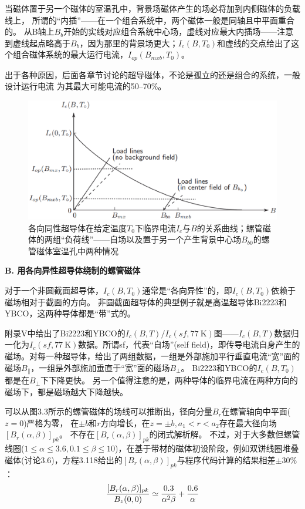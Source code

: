 当磁体置于另一个磁体的室温孔中，背景场磁体产生的场必将加到内侧磁体的负载线上，
所谓的“内插”——在一个组合系统中，两个磁体一般是同轴且中平面重合的。
从B轴上$B_{b}$开始的实线对应组合系统中心场，虚线对应最大内插场——注意到虚线起点略高于$B_{b}$，因为那里的背景场更大；$I_c(B,T_0)$和虚线的交点给出了这个组合磁体系统的最大运行电流，$I_{op}(B_{mxb},T_0)$。

出于各种原因，后面各章节讨论的超导磁体，不论是孤立的还是组合的系统，一般设计运行电流
为其最大可能电流的50–70\%。

\begin{figure}[htbp]
	\centering
	\includegraphics[scale=0.4]{chpt3/figs/fig3.19.eps}
	\caption{各向同性超导体在给定温度$T_0$下临界电流$I_c$与$B$的关系曲线；螺管磁体的两组“负荷线”——自场以及置于另一个产生背景中心场$B_{b0}$的螺管磁体室温孔中两种情况}
\end{figure}

\textbf{B. 用各向异性超导体绕制的螺管磁体}

对于一个非圆截面超导体，$I_c(B,T_0)$通常是“各向异性”的，即$I_c(B,T_0)$依赖于磁场相对于截面的方向。
非圆截面超导体的典型例子就是高温超导体Bi2223和YBCO，这两种导体都是“带”式的。

附录V中给出了Bi2223和YBCO的$I_c(B, T)/I_c(sf,77\ \mathrm{K})$图——$I_c(B, T)$数据归一化为$I_c(sf,77\ \mathrm{K})$数据。所谓sf，代表“自场”(self field)，即传导电流自身产生的磁场。对每一种超导体，给出了两组数据，一组是外部施加平行垂直电流“宽”面的磁场$B_{\parallel}$，一组是外部施加垂直于“宽”面的磁场$B_{\perp}$。 
Bi2223和YBCO的$I_c(B,T_0)$都是在$B_{\perp}$下下降更快。
另一个值得注意的是，两种导体的临界电流在两种方向的磁场下，都是磁场越大下降越快。

可以从图3.3所示的螺管磁体的场线可以推断出，径向分量$B_r$在螺管轴向中平面($z=0$)严格为零，
在$\pm b$和$r$方向增长，在$z=\pm b,a_1 < r < a_2$存在最大径向场$[B_r(\alpha,\beta)]_{pk}$。
不存在$[B_r(\alpha,\beta)]_{pk}$的闭式解析解。
不过，对于大多数但螺管线圈($1\le \alpha \le 3.6 , 0.1\le \beta \le 10$)，在基于带材的磁体初设阶段，例如双饼线圈堆叠磁体(讨论3.6)，方程3.118给出的$[B_{r}(\alpha,\beta)]_{pk}$与程序代码计算的结果相差$\pm 30\%$：
\begin{equation}
 \frac{[B_{r}(\alpha,\beta)]_{pk}}{B_{z}(0,0)}\simeq\frac{0.3}{\alpha^{2}\beta}+\frac{0.6}{\alpha}\\%
\end{equation}


